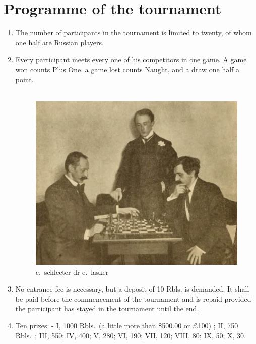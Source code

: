 \chapter{Programme of the tournament}

\begin{enumerate}
\item The number of participants in the tournament is limited to twenty, of whom one half are Russian players.

\item Every participant meets every one of his competitors in one game. A game won counts Plus One, a game lost counts Naught, and a draw one half a point.

\begin{figure}[h]
\centering
{}\\
\vspace{0.1cm}
\includegraphics[width=\textwidth]
{img/i1_schlecter-lasker.jpg}\\
\small
c.~schlecter \hspace{5cm} dr e.~lasker
\end{figure}

\item No entrance fee is necessary, but a deposit of 10 Rbls. is demanded. It shall be paid before the commencement of the tournament and is repaid provided the participant has stayed in the tournament until the end.

\item Ten prizes: - I, 1000 Rbls.~(a little more than \$500.00 or \pounds 100) ; II, 750 Rbls.~; III, 550; IV, 400; V, 280; VI, 190; VII, 120; VIII, 80; IX, 50; X, 30.


\end{enumerate}
